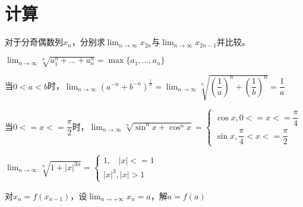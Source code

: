 \section{计算}

对于分奇偶数列\(x_n\)，分别求\(\displaystyle \lim_{n \to \infty}x_{2n}\)与\(\displaystyle \lim_{n \to \infty}x_{2n - 1}\)并比较。

\(\displaystyle \lim_{n \to \infty}\sqrt[n]{a_1^n + ... + a_n^n} = \max\{a_1, ..., a_n\}\)

当\(0 < a < b\)时，\(\displaystyle \lim_{n \to \infty}(a^{-n} + b^{-n})^{\frac{1}{n}} = \lim_{n \to \infty}\sqrt[n]{(\dfrac{1}{a})^n + (\dfrac{1}{b})^n} = \dfrac{1}{a}\)

当\(0 <= x <= \dfrac{\pi}{2}\)时，\(\displaystyle \lim_{n \to \infty}\sqrt[n]{\sin^nx + \cos^nx} = 
\begin{cases}
\cos x, 0 <= x <= \dfrac{\pi}{4} \\ 
\sin x, \dfrac{\pi}{4} < x <= \dfrac{\pi}{2}
\end{cases}\)

\(\displaystyle \lim_{n \to \infty}\sqrt[n]{1 + |x|^{3n}} = 
\begin{cases}
1,\ \ \ \ |x| <= 1 \\ 
|x|^3, |x| > 1
\end{cases}\)

对\(x_n = f(x_{n - 1})\)，设\(\displaystyle\lim_{n \to +\infty}x_n = a\)，解\(a = f(a)\)

